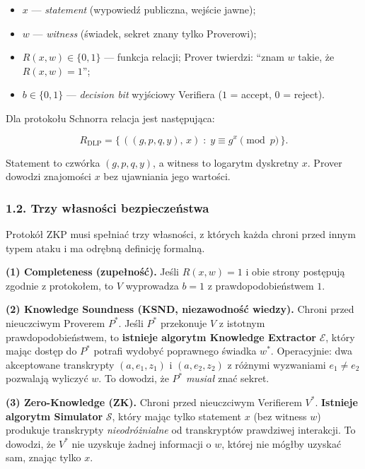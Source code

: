 \documentclass[
]{article}
\providecommand{\tightlist}{%
  \setlength{\itemsep}{0pt}\setlength{\parskip}{0pt}}
\begin{document}
\begin{itemize}
\tightlist
\item
  \(x\) --- \emph{statement} (wypowiedź publiczna, wejście jawne);
\item
  \(w\) --- \emph{witness} (świadek, sekret znany tylko Proverowi);
\item
  \(R(x, w) \in \{0, 1\}\) --- funkcja relacji; Prover twierdzi: ``znam
  \(w\) takie, że \(R(x, w) = 1\)'';
\item
  \(b \in \{0, 1\}\) --- \emph{decision bit} wyjściowy Verifiera (\(1\)
  = accept, \(0\) = reject).
\end{itemize}

Dla protokołu Schnorra relacja jest następująca:

\[R_{\mathrm{DLP}} = \big\{\, ((g, p, q, y),\, x) \;:\; y \equiv g^x \pmod{p} \,\big\}.\]

Statement to czwórka \((g, p, q, y)\), a witness to logarytm dyskretny
\(x\). Prover dowodzi znajomości \(x\) bez ujawniania jego wartości.

\subsubsection{1.2. Trzy własności
bezpieczeństwa}\label{trzy-wux142asnoux15bci-bezpieczeux144stwa}

Protokół ZKP musi spełniać trzy własności, z których każda chroni przed
innym typem ataku i ma odrębną definicję formalną.

\textbf{(1) Completeness (zupełność).} Jeśli \(R(x, w) = 1\) i obie
strony postępują zgodnie z protokołem, to \(V\) wyprowadza \(b = 1\) z
prawdopodobieństwem \(1\).

\textbf{(2) Knowledge Soundness (KSND, niezawodność wiedzy).} Chroni
przed nieuczciwym Proverem \(P^*\). Jeśli \(P^*\) przekonuje \(V\) z
istotnym prawdopodobieństwem, to \textbf{istnieje algorytm Knowledge
Extractor} \(\mathcal{E}\), który mając dostęp do \(P^*\) potrafi
wydobyć poprawnego świadka \(w^*\). Operacyjnie: dwa akceptowane
transkrypty \((a, e_1, z_1)\) i \((a, e_2, z_2)\) z różnymi wyzwaniami
\(e_1 \neq e_2\) pozwalają wyliczyć \(w\). To dowodzi, że \(P^*\)
\emph{musiał} znać sekret.

\textbf{(3) Zero-Knowledge (ZK).} Chroni przed nieuczciwym Verifierem
\(V^*\). \textbf{Istnieje algorytm Simulator} \(\mathcal{S}\), który
mając tylko statement \(x\) (bez witness \(w\)) produkuje transkrypty
\emph{nieodróżnialne} od transkryptów prawdziwej interakcji. To dowodzi,
że \(V^*\) nie uzyskuje żadnej informacji o \(w\), której nie mógłby
uzyskać sam, znając tylko \(x\).
\end{document}

